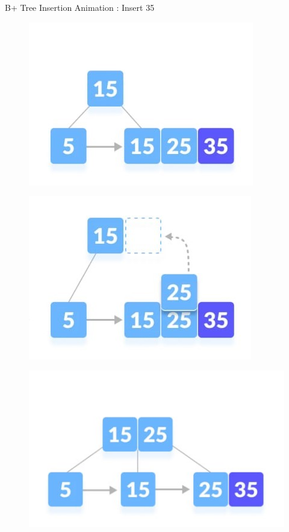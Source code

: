 \documentclass{beamer}
\begin{document}
\begin{frame}{B+ Tree Insertion Animation : \alert{Insert 35}}
    \begin{table}[h]
        \centering
        \begin{overprint}
        \begin{figure}
       
            \centering
            \includegraphics[scale=0.8]{Images/bi4_1_1.jpg}
        \end{figure}
        \begin{figure}
            \centering
            \includegraphics[scale=0.8]{Images/bi4_1_2.jpg}
        \end{figure}
        \begin{figure}
            \centering
            \includegraphics[scale=0.8]{Images/bi4_2.jpg}
        \end{figure}
        \end{overprint}
    \end{table} 
\end{frame}
\end{document}
